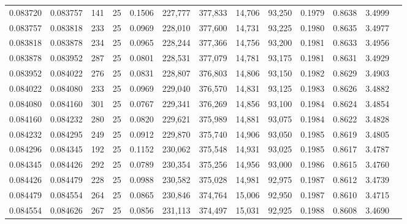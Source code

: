 \begin{tabular}{rrrrrrrrrrrrr}
0.083720 & 0.083757 &   141 &  25 &                                     0.1506 & 227,777 & 377,833 &  14,706 &  93,250 & 0.1979 & 0.8638 & 3.4999 \\
0.083757 & 0.083818 &   233 &  25 &                                     0.0969 & 228,010 & 377,600 &  14,731 &  93,225 & 0.1980 & 0.8635 & 3.4977 \\
0.083818 & 0.083878 &   234 &  25 &                                     0.0965 & 228,244 & 377,366 &  14,756 &  93,200 & 0.1981 & 0.8633 & 3.4956 \\
0.083878 & 0.083952 &   287 &  25 &                                     0.0801 & 228,531 & 377,079 &  14,781 &  93,175 & 0.1981 & 0.8631 & 3.4929 \\
0.083952 & 0.084022 &   276 &  25 &                                     0.0831 & 228,807 & 376,803 &  14,806 &  93,150 & 0.1982 & 0.8629 & 3.4903 \\
0.084022 & 0.084080 &   233 &  25 &                                     0.0969 & 229,040 & 376,570 &  14,831 &  93,125 & 0.1983 & 0.8626 & 3.4882 \\
0.084080 & 0.084160 &   301 &  25 &                                     0.0767 & 229,341 & 376,269 &  14,856 &  93,100 & 0.1984 & 0.8624 & 3.4854 \\
0.084160 & 0.084232 &   280 &  25 &                                     0.0820 & 229,621 & 375,989 &  14,881 &  93,075 & 0.1984 & 0.8622 & 3.4828 \\
0.084232 & 0.084295 &   249 &  25 &                                     0.0912 & 229,870 & 375,740 &  14,906 &  93,050 & 0.1985 & 0.8619 & 3.4805 \\
0.084296 & 0.084345 &   192 &  25 &                                     0.1152 & 230,062 & 375,548 &  14,931 &  93,025 & 0.1985 & 0.8617 & 3.4787 \\
0.084345 & 0.084426 &   292 &  25 &                                     0.0789 & 230,354 & 375,256 &  14,956 &  93,000 & 0.1986 & 0.8615 & 3.4760 \\
0.084426 & 0.084479 &   228 &  25 &                                     0.0988 & 230,582 & 375,028 &  14,981 &  92,975 & 0.1987 & 0.8612 & 3.4739 \\
0.084479 & 0.084554 &   264 &  25 &                                     0.0865 & 230,846 & 374,764 &  15,006 &  92,950 & 0.1987 & 0.8610 & 3.4715 \\
0.084554 & 0.084626 &   267 &  25 &                                     0.0856 & 231,113 & 374,497 &  15,031 &  92,925 & 0.1988 & 0.8608 & 3.4690 \\

\end{tabular}
